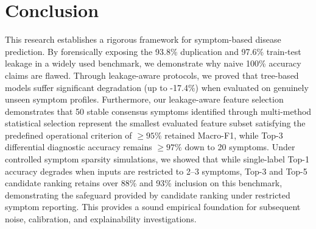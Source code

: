 \section{Conclusion}
\label{sec:conclusion}

This research establishes a rigorous framework for symptom-based disease prediction. By forensically exposing the 93.8\% duplication and 97.6\% train-test leakage in a widely used benchmark, we demonstrate why naive 100\% accuracy claims are flawed. Through leakage-aware protocols, we proved that tree-based models suffer significant degradation (up to -17.4\%) when evaluated on genuinely unseen symptom profiles. Furthermore, our leakage-aware feature selection demonstrates that 50 stable consensus symptoms identified through multi-method statistical selection represent the smallest evaluated feature subset satisfying the predefined operational criterion of $\ge 95\%$ retained Macro-F1, while Top-3 differential diagnostic accuracy remains $\ge 97\%$ down to 20 symptoms. Under controlled symptom sparsity simulations, we showed that while single-label Top-1 accuracy degrades when inputs are restricted to 2--3 symptoms, Top-3 and Top-5 candidate ranking retains over 88\% and 93\% inclusion on this benchmark, demonstrating the safeguard provided by candidate ranking under restricted symptom reporting. This provides a sound empirical foundation for subsequent noise, calibration, and explainability investigations.
